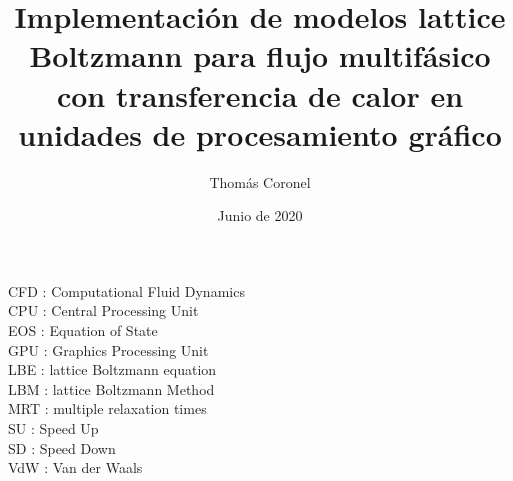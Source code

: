 \documentclass[12pt,papel,oneside]{ibtesis}
\title{Implementación de modelos lattice Boltzmann para flujo multifásico con transferencia de calor en unidades de procesamiento gráfico}
\author{Thomás Coronel}
\date{Junio de 2020}
\begin{document}
  


\begin{preliminary}





\tableofcontents                %

\begin{abreviaturas}
	
	CFD : Computational Fluid Dynamics\\
	
	CPU : Central Processing Unit\\
	
	EOS : Equation of State\\
	
	GPU : Graphics Processing Unit\\
	
	LBE : lattice Boltzmann equation\\
	
	LBM : lattice Boltzmann Method\\
	
	MRT : multiple relaxation times\\
	
	SU  : Speed Up\\
	
	SD : Speed Down\\
	
	VdW : Van der Waals\\
	
	
\end{abreviaturas}

\end{preliminary}







\end{document}
